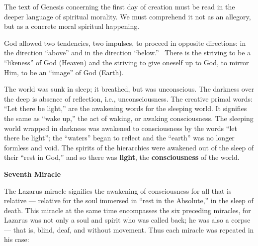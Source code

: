 The text of Genesis concerning the first day of creation must be read in the deeper language of spiritual morality. We
must comprehend it not as an allegory, but as a concrete moral spiritual happening.

God allowed two tendencies, two impulses, to proceed in opposite directions: in the direction “above” and in the
direction “below.”  There is the striving to be a “likeness” of God (Heaven) and the striving to give oneself up to
God, to mirror Him, to be an “image” of God (Earth).

The world was sunk in sleep; it breathed, but was unconscious. The darkness over the deep is absence of reflection,
i.e., unconsciousness. The creative primal words: “Let there be light,” are the awakening words for the sleeping world.
It signifies the same as “wake up,” the act of waking, or awaking consciousness. The sleeping world wrapped in darkness
was awakened to consciousness by the words “let there be light”; the “waters” began to reflect and the “earth” was no
longer formless and void. The spirits of the hierarchies were awakened out of the sleep of their “rest in God,” and so
there was \textbf{light}, the \textbf{consciousness} of the world.

\textbf{Seventh Miracle}

The Lazarus miracle signifies the awakening of consciousness for all that is relative — relative
for the soul immersed in “rest in the Absolute,” in the sleep of death. This miracle at the same time encompasses the
six preceding miracles, for Lazarus was not only a soul and spirit who was called back; he was also a corpse
— that is, blind, deaf, and without movement. Thus each miracle was repeated in his case:


